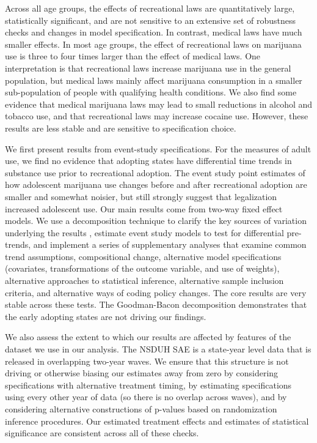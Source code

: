 \documentclass[12pt]{article}%
\begin{document}
Across all age groups, the effects of recreational laws are quantitatively large, statistically significant, and are not sensitive to an extensive set of robustness checks and changes in model specification. In contrast, medical laws have much smaller effects. In most age groups, the effect of recreational laws on marijuana use  is three to four times larger than the effect of medical laws. One interpretation is that recreational laws increase marijuana use in the general population, but medical laws mainly affect marijuana consumption in a smaller sub-population of people with qualifying health conditions. We also find some evidence that medical marijuana laws may lead to small reductions in alcohol and tobacco use, and that recreational laws may increase cocaine use. However, these results are less stable and are sensitive to specification choice. 

We first present results from event-study specifications.  
For the measures of adult use, we find no evidence that adopting states have differential time trends in substance use prior to  recreational adoption. 
The event study point estimates of how adolescent marijuana use changes before and after recreational adoption are smaller and somewhat noisier, but still strongly suggest that legalization increased adolescent use. 
Our main results come from two-way fixed effect models. 
We use a decomposition technique to clarify the key sources of variation underlying the results \citep{Goodman-Bacon2018}, estimate event study models to test for differential pre-trends, and implement a series of supplementary analyses that examine common trend assumptions, compositional change, alternative model specifications (covariates, transformations of the outcome variable, and use of weights),  alternative approaches to statistical inference, alternative sample inclusion criteria, and alternative ways of coding policy changes. The core results are very stable across these tests.  The Goodman-Bacon decomposition demonstrates that the early adopting states are not driving our findings. 

We also assess the extent to which our results are affected by features of the dataset we use in our analysis. The NSDUH SAE is a state-year level data that is released in overlapping two-year waves. We ensure that this structure is not driving or otherwise biasing our estimates away from zero by considering specifications with alternative treatment timing, by estimating specifications using every other year of data (so there is no overlap across waves), and by considering alternative constructions of p-values based on randomization inference procedures.  Our estimated treatment effects and estimates of statistical significance are consistent across all of these checks. 
\end{document}

